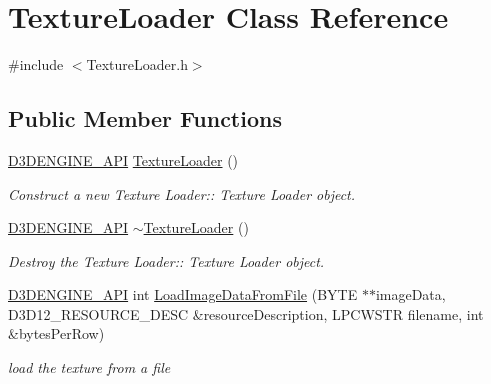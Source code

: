 \hypertarget{class_texture_loader}{}\section{Texture\+Loader Class Reference}
\label{class_texture_loader}


{\ttfamily \#include $<$Texture\+Loader.\+h$>$}

\subsection*{Public Member Functions}
\begin{DoxyCompactItemize}
\item 
\mbox{\hyperlink{stdafx_8h_a8ee2d990c5dfba7794dd2b60741d7722}{D3\+D\+E\+N\+G\+I\+N\+E\+\_\+\+A\+PI}} \mbox{\hyperlink{class_texture_loader_aafa6ca3bdbee3874a73aafae39d5c804}{Texture\+Loader}} ()
\begin{DoxyCompactList}\small\item\em Construct a new Texture Loader\+:\+: Texture Loader object. \end{DoxyCompactList}\item 
\mbox{\hyperlink{stdafx_8h_a8ee2d990c5dfba7794dd2b60741d7722}{D3\+D\+E\+N\+G\+I\+N\+E\+\_\+\+A\+PI}} \mbox{\hyperlink{class_texture_loader_aee3a49f73e5f88890658b17e9896c4f2}{$\sim$\+Texture\+Loader}} ()
\begin{DoxyCompactList}\small\item\em Destroy the Texture Loader\+:\+: Texture Loader object. \end{DoxyCompactList}\item 
\mbox{\hyperlink{stdafx_8h_a8ee2d990c5dfba7794dd2b60741d7722}{D3\+D\+E\+N\+G\+I\+N\+E\+\_\+\+A\+PI}} int \mbox{\hyperlink{class_texture_loader_a089f3c76583c3401fcadd85d26d65b31}{Load\+Image\+Data\+From\+File}} (B\+Y\+TE $\ast$$\ast$image\+Data, D3\+D12\+\_\+\+R\+E\+S\+O\+U\+R\+C\+E\+\_\+\+D\+E\+SC \&resource\+Description, L\+P\+C\+W\+S\+TR filename, int \&bytes\+Per\+Row)
\begin{DoxyCompactList}\small\item\em load the texture from a file \end{DoxyCompactList}\end{DoxyCompactItemize}
